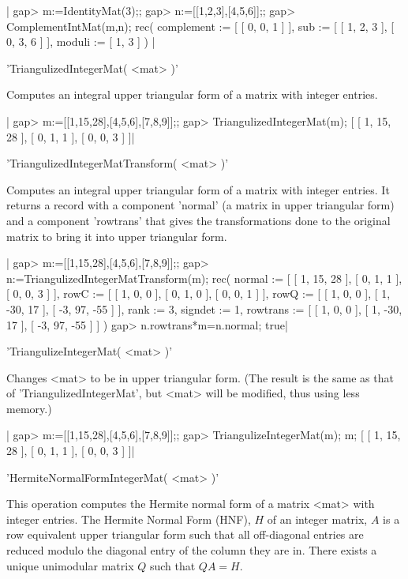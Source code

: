 |    gap> m:=IdentityMat(3);;
    gap> n:=[[1,2,3],[4,5,6]];;
    gap> ComplementIntMat(m,n);
    rec( complement := [ [ 0, 0, 1 ] ], sub := [ [ 1, 2, 3 ], [ 0, 3, 6 ] ],
      moduli := [ 1, 3 ] ) |

'TriangulizedIntegerMat( <mat> )'

Computes  an  integral  upper  triangular  form  of  a  matrix with integer
entries.

|    gap> m:=[[1,15,28],[4,5,6],[7,8,9]];;
    gap> TriangulizedIntegerMat(m);
    [ [ 1, 15, 28 ], [ 0, 1, 1 ], [ 0, 0, 3 ] ]|

'TriangulizedIntegerMatTransform( <mat> )'

Computes  an  integral  upper  triangular  form  of  a  matrix with integer
entries.  It returns a record with a  component 'normal' (a matrix in upper
triangular  form) and a component 'rowtrans' that gives the transformations
done to the original matrix to bring it into upper triangular form.

|    gap> m:=[[1,15,28],[4,5,6],[7,8,9]];;
    gap> n:=TriangulizedIntegerMatTransform(m);
    rec( normal := [ [ 1, 15, 28 ], [ 0, 1, 1 ], [ 0, 0, 3 ] ],
      rowC := [ [ 1, 0, 0 ], [ 0, 1, 0 ], [ 0, 0, 1 ] ],
      rowQ := [ [ 1, 0, 0 ], [ 1, -30, 17 ], [ -3, 97, -55 ] ], rank := 3,
      signdet := 1, rowtrans := [ [ 1, 0, 0 ], [ 1, -30, 17 ], [ -3, 97, -55 ] ] )
    gap> n.rowtrans*m=n.normal;
    true|

'TriangulizeIntegerMat( <mat> )'

Changes  <mat> to be in  upper triangular form. (The  result is the same as
that  of 'TriangulizedIntegerMat', but  <mat> will be  modified, thus using
less memory.)

|    gap> m:=[[1,15,28],[4,5,6],[7,8,9]];;
    gap> TriangulizeIntegerMat(m); m;
    [ [ 1, 15, 28 ], [ 0, 1, 1 ], [ 0, 0, 3 ] ]|

'HermiteNormalFormIntegerMat( <mat> )'

This  operation computes  the Hermite  normal form  of a  matrix <mat> with
integer  entries. The Hermite Normal Form  (HNF), $H$ of an integer matrix,
$A$  is a row  equivalent upper triangular  form such that all off-diagonal
entries  are reduced modulo the  diagonal entry of the  column they are in.
There exists a unique unimodular matrix $Q$ such that $QA = H$.

